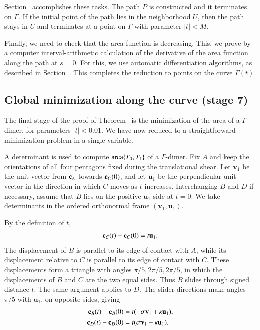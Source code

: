 Section~ accomplishes these tasks.  The path $P$ is
constructed and it terminates on $\Gamma$.  If the initial point of
the path lies in the neighborhood $U$, then the path stays in $U$
and terminates at a point on $\Gamma$ with parameter $|t|<M$.

Finally, we need to check that the area function is decreasing. This,
we prove by a computer interval-arithmetic calculation of the derivative of the area
function along the path at $s=0$.  For this, we use automatic
differentiation algorithms, as described in
Section~.  This completes the reduction to points
on the curve $\Gamma(t)$.

\subsection{Global minimization along the curve (stage 7)}

The final stage of the proof of Theorem~ is the
minimization of the area of a $\Gamma$-dimer, for parameters
$|t|<0.01$.  We have now reduced to a straightforward minimization problem in a
single variable. 

A determinant is used to compute ${\operatorname{area}}\{T_0,T_1\}$ of a $\Gamma$-dimer.
Fix $A$ and keep the
orientations of all four pentagons fixed during the translational
shear. Let $\mathbf v_1$ be the unit vector from ${\mathbf c}_A$ towards
${\mathbf c}_C(0)$, and let $\mathbf u_1$ be the perpendicular unit vector in
the direction in which $C$ moves as $t$ increases. Interchanging
$B$ and $D$ if necessary, assume that $B$ lies on the
positive-$\mathbf u_1$ side at $t=0$. We take determinants in the
ordered orthonormal frame $(\mathbf v_1,\mathbf u_1)$.

By the definition of $t$,
\[
{\mathbf c}_C(t)-{\mathbf c}_C(0)=t\mathbf u_1.
\]
The displacement of $B$ is parallel to its edge of contact with
$A$, while its displacement relative to $C$ is parallel to its
edge of contact with $C$. These displacements form a triangle
with angles $\pi/5,2\pi/5,2\pi/5$, in which the displacements of
$B$ and $C$ are the two equal sides. Thus $B$ slides through
signed distance $t$. The same argument applies to $D$. The
slider directions make angles $\pi/5$ with $\mathbf u_1$, on
opposite sides, giving
\[
\begin{aligned}
{\mathbf c}_B(t)-{\mathbf c}_B(0)&=t(-\sigma\mathbf v_1+\kappa\mathbf u_1),\\
{\mathbf c}_D(t)-{\mathbf c}_D(0)&=t(\sigma\mathbf v_1+\kappa\mathbf u_1).
\end{aligned}
\]

